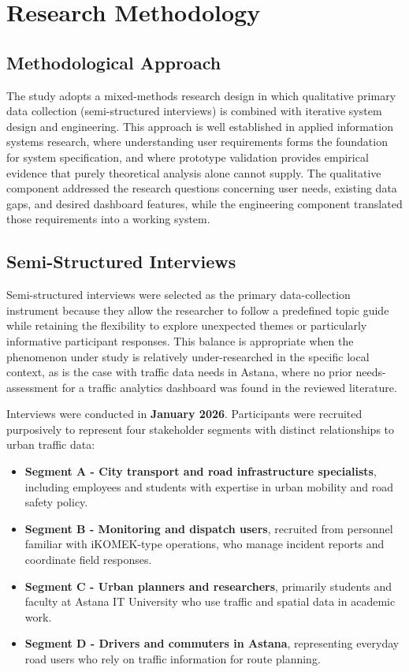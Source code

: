 \documentclass[12pt,a4paper]{report}
\begin{document}
\section{Research Methodology}
\label{sec:methodology}

\subsection{Methodological Approach}

The study adopts a mixed-methods research design in which qualitative
primary data collection (semi-structured interviews) is combined with
iterative system design and engineering. This approach is well
established in applied information systems research, where understanding
user requirements forms the foundation for system specification, and
where prototype validation provides empirical evidence that purely
theoretical analysis alone cannot supply. The qualitative component
addressed the research questions concerning user needs, existing data
gaps, and desired dashboard features, while the engineering component
translated those requirements into a working system.

\subsection{Semi-Structured Interviews}

Semi-structured interviews were selected as the primary data-collection
instrument because they allow the researcher to follow a predefined
topic guide while retaining the flexibility to explore unexpected
themes or particularly informative participant responses. This balance
is appropriate when the phenomenon under study is relatively
under-researched in the specific local context, as is the case with
traffic data needs in Astana, where no prior needs-assessment for a
traffic analytics dashboard was found in the reviewed literature.

Interviews were conducted in \textbf{January 2026}. Participants were
recruited purposively to represent four stakeholder segments with
distinct relationships to urban traffic data:

\begin{itemize}[leftmargin=2cm]
  \item \textbf{Segment A - City transport and road infrastructure specialists}, including
        employees and students with expertise in urban mobility and road safety policy.
  \item \textbf{Segment B - Monitoring and dispatch users}, recruited from personnel familiar
        with iKOMEK-type operations, who manage incident reports and coordinate field responses.
  \item \textbf{Segment C - Urban planners and researchers}, primarily students and faculty at
        Astana IT University who use traffic and spatial data in academic work.
  \item \textbf{Segment D - Drivers and commuters in Astana}, representing everyday road users
        who rely on traffic information for route planning.
\end{itemize}
\end{document}
